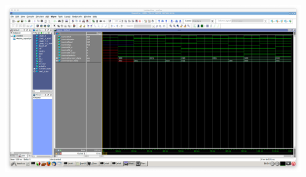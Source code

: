 \documentclass{article}
\begin{document}
\begin{center}
    \includegraphics[scale=0.23]{part2_modelsim_control.png}
\end{center}
\end{document}
